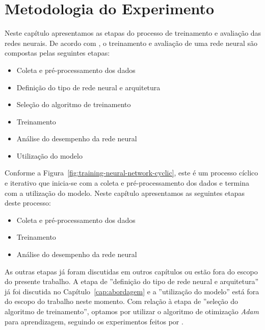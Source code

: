 \chapter{Metodologia do Experimento}
\label{cap:experimento}


Neste capítulo apresentamos as etapas do processo de treinamento e avaliação das redes neurais. De acordo com , o treinamento e avaliação de uma rede neural são compostas pelas seguintes etapas:
\begin{itemize}
    \item Coleta e pré-processamento dos dados
    \item Definição do tipo de rede neural e arquitetura
    \item Seleção do algoritmo de treinamento
    \item Treinamento
    \item Análise do desempenho da rede neural
    \item Utilização do modelo
\end{itemize}

Conforme a Figura~\ref{fig:training-neural-network-cyclic}, este é um processo cíclico e iterativo que inicia-se com a coleta e pré-processamento dos dados e termina com a utilização do modelo. Neste capítulo apresentamos as seguintes etapas deste processo:

\begin{itemize}
    \item Coleta e pré-processamento dos dados
    \item Treinamento
    \item Análise do desempenho da rede neural
\end{itemize}

As outras etapas já foram discutidas em outros capítulos ou estão fora do escopo do presente trabalho. A etapa de ''definição do tipo de rede neural e arquitetura'' já foi discutida no Capítulo~\ref{cap:abordagem} e a ''utilização do modelo'' está fora do escopo do trabalho neste momento. Com relação à etapa de ''seleção do algoritmo de treinamento'', optamos por utilizar o algoritmo de otimização \emph{Adam} para aprendizagem, seguindo os experimentos feitos por . 



